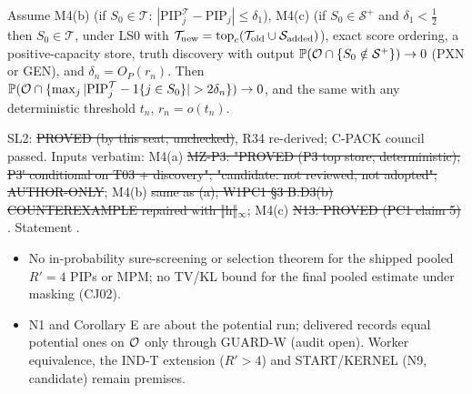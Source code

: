 \begin{corollary}\label{cor:SL2}
Assume M4(b) (if $S_0\in\mathcal T$: $|\mathrm{PIP}^{\mathcal T}_j-\mathrm{PIP}_j|\le\delta_1$), M4(c) (if $S_0\in\mathcal S^{+}$ and $\delta_1<\frac12$ then $S_0\in\mathcal T$, under LS0 with $\mathcal T_{\rm new}=\mathrm{top}_c(\mathcal T_{\rm old}\cup\mathcal S_{\rm added})$), exact score ordering, a positive-capacity store, truth discovery with output $\mathbb P(\mathcal O\cap\{S_0\notin\mathcal S^{+}\})\to0$ (PXN or GEN), and $\delta_n=O_P(r_n)$. Then $\PP(\Ocal\cap\{\max_j|\mathrm{PIP}^{\mathcal T}_j-1\{j\in S_0\}|>2\delta_n\})\to0$, and the same with any deterministic threshold $t_n$, $r_n=o(t_n)$.
\end{corollary}
\begin{statusbox}
SL2: \st{PROVED (by this seat, unchecked)}, R34 re-derived; C-PACK council passed. Inputs verbatim: M4(a) \st{MZ-P3: "PROVED (P3 top store, deterministic); P3′ conditional on T03 + discovery"; "candidate: not reviewed, not adopted"; AUTHOR-ONLY}; M4(b) \st{same as (a); W1PC1 §3 B.D3(b) COUNTEREXAMPLE repaired with ‖h‖$_{\infty}$}; M4(c) \st{N13: PROVED (PC1 claim 5)} . Statement .
\end{statusbox}
\begin{notproved}
\begin{itemize}
\item No in-probability sure-screening or selection theorem for the shipped pooled $R'=4$ PIPs or MPM; no TV/KL bound for the final pooled estimate under masking (CJ02).
\item N1 and Corollary E are about the potential run; delivered records equal potential ones on $\mathcal O$ only through GUARD-W (audit open). Worker equivalence, the IND-T extension ($R'>4$) and START/KERNEL (N9, candidate) remain premises.
\end{itemize}
\end{notproved}
